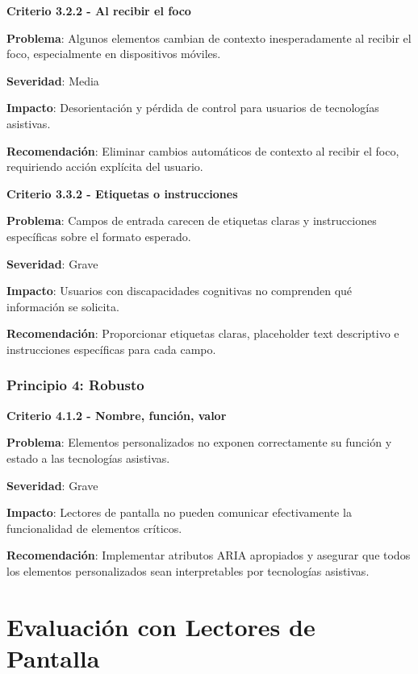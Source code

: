 \documentclass{article}
\begin{document}
	\noindent
	\textbf{Criterio 3.2.2 - Al recibir el foco}
	
	\noindent
	\textbf{Problema}: Algunos elementos cambian de contexto inesperadamente al recibir el foco, especialmente en dispositivos móviles.
	
	\noindent
	\textbf{Severidad}: Media
	
	\noindent
	\textbf{Impacto}: Desorientación y pérdida de control para usuarios de tecnologías asistivas.
	
	\noindent
	\textbf{Recomendación}: Eliminar cambios automáticos de contexto al recibir el foco, requiriendo acción explícita del usuario.
	
	\vspace{0.5cm}
	
	\noindent
	\textbf{Criterio 3.3.2 - Etiquetas o instrucciones}
	
	\noindent
	\textbf{Problema}: Campos de entrada carecen de etiquetas claras y instrucciones específicas sobre el formato esperado.
	
	\noindent
	\textbf{Severidad}: Grave
	
	\noindent
	\textbf{Impacto}: Usuarios con discapacidades cognitivas no comprenden qué información se solicita.
	
	\noindent
	\textbf{Recomendación}: Proporcionar etiquetas claras, placeholder text descriptivo e instrucciones específicas para cada campo.

	\subsubsection{Principio 4: Robusto}
	
	\noindent
	\textbf{Criterio 4.1.2 - Nombre, función, valor}
	
	\noindent
	\textbf{Problema}: Elementos personalizados no exponen correctamente su función y estado a las tecnologías asistivas.
	
	\noindent
	\textbf{Severidad}: Grave
	
	\noindent
	\textbf{Impacto}: Lectores de pantalla no pueden comunicar efectivamente la funcionalidad de elementos críticos.
	
	\noindent
	\textbf{Recomendación}: Implementar atributos ARIA apropiados y asegurar que todos los elementos personalizados sean interpretables por tecnologías asistivas.

	\section{Evaluación con Lectores de Pantalla}
\end{document}
